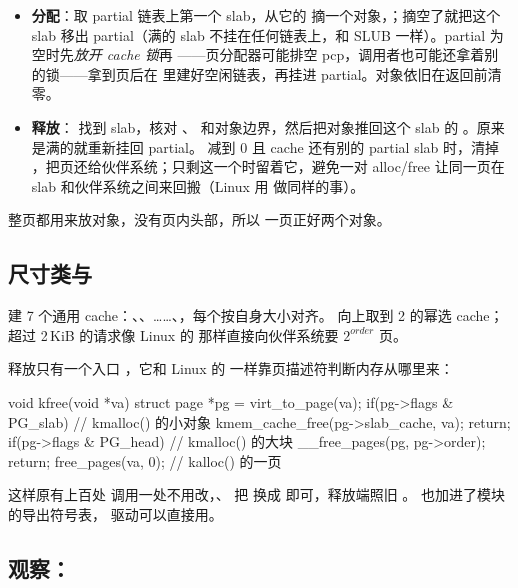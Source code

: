 \begin{itemize}
  \item \textbf{分配}：取 partial 链表上第一个 slab，从它的  摘一个对象，；摘空了就把这个 slab 移出 partial（满的 slab 不挂在任何链表上，和 SLUB 一样）。partial 为空时先\emph{放开 cache 锁}再 ——页分配器可能排空 pcp，调用者也可能还拿着别的锁——拿到页后在  里建好空闲链表，再挂进 partial。对象依旧在返回前清零。
  \item \textbf{释放}： 找到 slab，核对 、 和对象边界，然后把对象推回这个 slab 的 。原来是满的就重新挂回 partial。 减到 0 且 cache 还有别的 partial slab 时，清掉 ，把页还给伙伴系统；只剩这一个时留着它，避免一对 alloc/free 让同一页在 slab 和伙伴系统之间来回搬（Linux 用  做同样的事）。
\end{itemize}

整页都用来放对象，没有页内头部，所以  一页正好两个对象。

\subsection{尺寸类与 }

 建 7 个通用 cache：、、……、，每个按自身大小对齐。 向上取到 2 的幂选 cache；超过 2\,KiB 的请求像 Linux 的  那样直接向伙伴系统要 $2^{order}$ 页。

释放只有一个入口 ，它和 Linux 的  一样靠页描述符判断内存从哪里来：

\begin{ccode}
void kfree(void *va) {
  struct page *pg = virt_to_page(va);
  if(pg->flags & PG_slab){            // kmalloc() 的小对象
    kmem_cache_free(pg->slab_cache, va);
    return;
  }
  if(pg->flags & PG_head){            // kmalloc() 的大块
    __free_pages(pg, pg->order);
    return;
  }
  free_pages(va, 0);                  // kalloc() 的一页
}
\end{ccode}

这样原有上百处  调用一处不用改，、 把  换成  即可，释放端照旧 。 也加进了模块的导出符号表， 驱动可以直接用。

\subsection{观察：}

